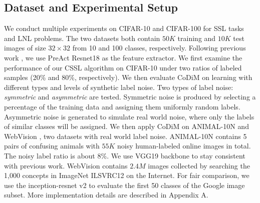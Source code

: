 \documentclass[letterpaper]{article} \usepackage{aaai22}  \usepackage{times}  \usepackage{helvet}  \usepackage{courier}  \usepackage[hyphens]{url}  \usepackage{graphicx} \usepackage{subfigure}
\begin{document}
\subsection{Dataset and Experimental Setup}
We conduct multiple experiments on CIFAR-10 and CIFAR-100 \cite{krizhevsky2009learning} for SSL tasks and LNL problems. The two datasets both contain $50K$ training and $10K$ test images of size $32 \times 32$ from 10 and 100 classes, respectively. Following previous work \cite{li2020dividemix}, we use PreAct Resnet18 as the feature extractor. We first examine the performance of our CSSL algorithm on CIFAR-10 under two ratios of labeled samples (20\% and 80\%, respectively). We then evaluate CoDiM on learning with different types and levels of synthetic label noise. Two types of label noise: \textit{symmetric} and \textit{asymmetric} are tested. Symmetric noise is produced by selecting a percentage of the training data and assigning them uniformly random labels. Asymmetric noise is generated to simulate real world noise, where only the labels of similar classes will be assigned. We then apply CoDiM on ANIMAL-10N \cite{song2019selfie} and WebVision \cite{li2017webvision}, two datasets with real world label noise. ANIMAL-10N contains 5 pairs of confusing animals with $55K$ noisy human-labeled online images in total. The noisy label ratio is about 8\%. We use VGG19 backbone to stay consistent with previous work. WebVision contains $2.4M$ images collected by searching the 1,000 concepts in ImageNet ILSVRC12 on the Internet. For fair comparison, we use the inception-resnet v2 to evaluate the first 50 classes of the Google image subset. More implementation details are described in Appendix A.
\end{document}
